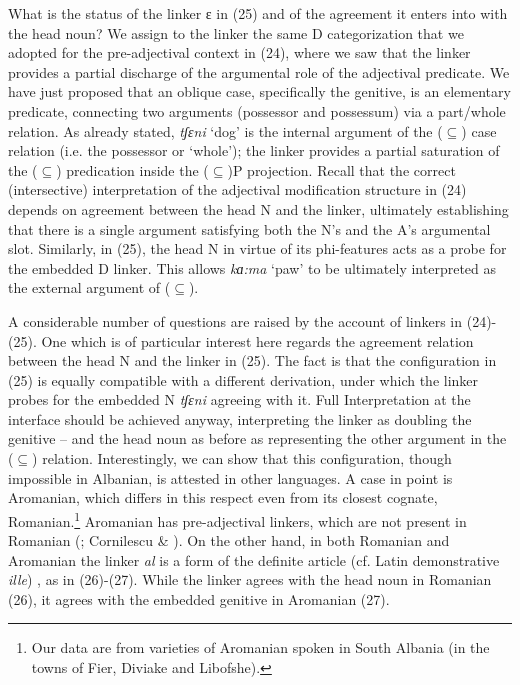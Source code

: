 \documentclass[output=paper]{langsci/langscibook}
\begin{document}
What is the status of the linker ɛ in (25) and of the agreement it enters into with the head noun? We assign to the linker the same D categorization that we adopted for the pre-adjectival context in (24), where we saw that the linker provides a partial discharge of the argumental role of the adjectival predicate. We have just proposed that an oblique case, specifically the genitive, is an elementary predicate, connecting two arguments (possessor and possessum) via a part/whole relation. As already stated, \textit{tʃɛni} ‘dog’ is the internal argument of the ($\subseteq$) case relation (i.e. the possessor or ‘whole’); the linker provides a partial saturation of the ($\subseteq$) predication inside the ($\subseteq$)P projection. Recall that the correct (intersective) interpretation of the adjectival modification structure in (24) depends on agreement between the head N and the linker, ultimately establishing that there is a single argument satisfying both the N’s and the A’s argumental slot. Similarly, in (25), the head N in virtue of its phi-features acts as a probe for the embedded D linker. This allows \textit{kɑ:ma} ‘paw’ to be ultimately interpreted as the external argument of ($\subseteq$).

A considerable number of questions are raised by the account of linkers in (24)-(25). One which is of particular interest here regards the agreement relation between the head N and the linker in (25). The fact is that the configuration in (25) is equally compatible with a different derivation, under which the linker probes for the embedded N \textit{tʃɛni} agreeing with it. Full Interpretation at the interface should be achieved anyway, interpreting the linker as doubling the genitive – and the head noun as before as representing the other argument in the ($\subseteq$) relation. Interestingly, we can show that this configuration, though impossible in Albanian, is attested in other languages. A case in point is Aromanian, which differs in this respect even from its closest cognate, Romanian.\footnote{Our data are from varieties of Aromanian spoken in South Albania (in the towns of Fier, Diviake and Libofshe).} Aromanian has pre-adjectival linkers, which are not present in Romanian (\citealt{Campos2008}; Cornilescu \& \citealt{Giurgea2013}). On the other hand, in both Romanian and Aromanian the linker \textit{al} is a form of the definite article (cf. Latin demonstrative \textit{ille}) \citep{Giurgea2012}, as in (26)-(27). While the linker agrees with the head noun in Romanian (26), it agrees with the embedded genitive in Aromanian (27).
\end{document}
